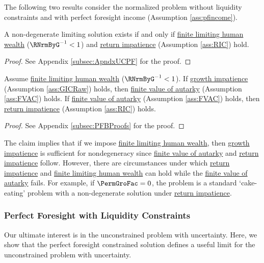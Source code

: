 \documentclass[BufferStockTheory]{subfiles}
\begin{document}
The following two results consider the normalized problem without liquidity constraints and with perfect foresight income (Assumption \ref{ass:pfincome}).

\begin{proposition}\label{prop:pfUCFHWC}
 A non-degenerate limiting solution exists if and only if \hyperlink{FHWC}{finite limiting  human wealth} ($\RNrmByG^{-1}<1$) and \hyperlink{RIC}{return impatience} (Assumption \ref{ass:RIC}) hold. 
\end{proposition}
\begin{proof}\let\qed\relax
  See Appendix \ref{subsec:ApndxUCPF} for the proof.

\end{proof}
  

\begin{claim}\label{claim:PFConspC}
Assume \hyperlink{FHWC}{finite limiting human wealth} ($\RNrmByG^{-1}<1$). If \hyperlink{GIC}{growth impatience} (Assumption \ref{ass:GICRaw}) holds, then \hyperlink{FVAC}{finite value of autarky} (Assumption \ref{ass:FVAC}) holds. If \hyperlink{FVAC}{finite value of autarky} (Assumption \ref{ass:FVAC}) holds, then \hyperlink{RIC}{return impatience} (Assumption \ref{ass:RIC}) holds. 
\end{claim}
\begin{proof}\let\qed\relax
See Appendix \ref{subsec:PFBProofs} for the proof.
\end{proof}

The claim implies that if we impose \hyperlink{FHWC}{finite limiting  human wealth}, then  \hyperlink{GIC}{growth impatience} is sufficient for nondegeneracy since \hyperlink{FVAC}{finite value of autarky} and \hyperlink{RIC}{return impatience} follow.
However, there are circumstances under which \hyperlink{RIC}{return impatience} and \hyperlink{FHWC}{finite limiting  human wealth} can hold while the \hyperlink{FVAC}{finite value of autarky} fails.
For example, if $\PermGroFac=0$, the problem is a standard `cake-eating' problem with a non-degenerate solution under \hyperlink{RIC}{return impatience}.


\subsubsection{Perfect Foresight with Liquidity Constraints}

Our ultimate interest is in the unconstrained problem with uncertainty.
Here, we show that the perfect foresight constrained solution defines a useful limit for the unconstrained problem with uncertainty.
\end{document}
